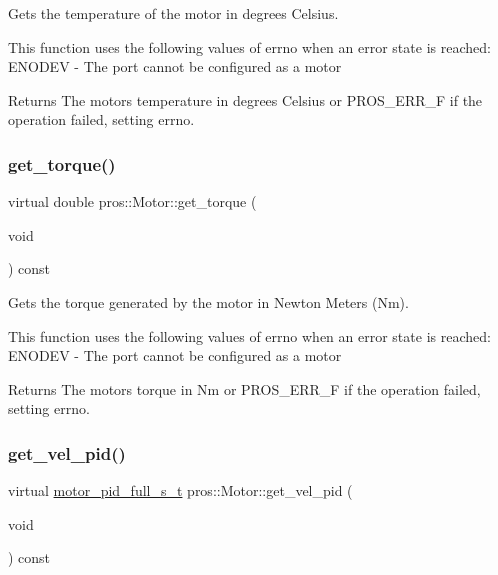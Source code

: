 Gets the temperature of the motor in degrees Celsius.

This function uses the following values of errno when an error state is reached\+: E\+N\+O\+D\+EV -\/ The port cannot be configured as a motor

\begin{DoxyReturn}{Returns}
The motor\textquotesingle{}s temperature in degrees Celsius or P\+R\+O\+S\+\_\+\+E\+R\+R\+\_\+F if the operation failed, setting errno. 
\end{DoxyReturn}
\mbox{\label{classpros_1_1Motor_a14e0c57c0ca7bde15f73414abf4c3c8e}} 
\subsubsection{\texorpdfstring{get\+\_\+torque()}{get\_torque()}}
{\footnotesize\ttfamily virtual double pros\+::\+Motor\+::get\+\_\+torque (\begin{DoxyParamCaption}\item[{void}]{ }\end{DoxyParamCaption}) const\hspace{0.3cm}{\ttfamily [virtual]}}

Gets the torque generated by the motor in Newton Meters (Nm).

This function uses the following values of errno when an error state is reached\+: E\+N\+O\+D\+EV -\/ The port cannot be configured as a motor

\begin{DoxyReturn}{Returns}
The motor\textquotesingle{}s torque in Nm or P\+R\+O\+S\+\_\+\+E\+R\+R\+\_\+F if the operation failed, setting errno. 
\end{DoxyReturn}
\mbox{\label{classpros_1_1Motor_a2b939563c3b915d7b8ce3dd1dece6208}} 
\subsubsection{\texorpdfstring{get\+\_\+vel\+\_\+pid()}{get\_vel\_pid()}}
{\footnotesize\ttfamily virtual \hyperlink{motors_8h_a0295cbf49f5c70c17b5fa962bd25febd}{motor\+\_\+pid\+\_\+full\+\_\+s\+\_\+t} pros\+::\+Motor\+::get\+\_\+vel\+\_\+pid (\begin{DoxyParamCaption}\item[{void}]{ }\end{DoxyParamCaption}) const\hspace{0.3cm}{\ttfamily [virtual]}}

